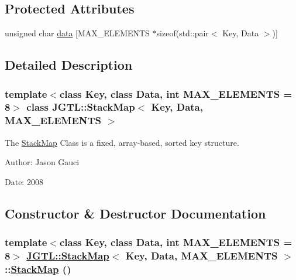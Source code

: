 \subsection*{Protected Attributes}
\begin{CompactItemize}
\item 
unsigned char \hyperlink{class_j_g_t_l_1_1_stack_map_9a3cc307f2892b669714253d75792e2e}{data} \mbox{[}MAX\_\-ELEMENTS $\ast$sizeof(std::pair$<$ Key, Data $>$)\mbox{]}
\end{CompactItemize}


\subsection{Detailed Description}
\subsubsection*{template$<$class Key, class Data, int MAX\_\-ELEMENTS = 8$>$ class JGTL::Stack\-Map$<$ Key, Data, MAX\_\-ELEMENTS $>$}

The \hyperlink{class_j_g_t_l_1_1_stack_map}{Stack\-Map} Class is a fixed, array-based, sorted key structure. 

\begin{Desc}
\item[Author:]Jason Gauci \end{Desc}
\begin{Desc}
\item[Date:]2008 \end{Desc}




\subsection{Constructor \& Destructor Documentation}
\hypertarget{class_j_g_t_l_1_1_stack_map_e6cb52e89d332a1438fa0b807081c46a}{
\subsubsection[StackMap]{\setlength{\rightskip}{0pt plus 5cm}template$<$class Key, class Data, int MAX\_\-ELEMENTS = 8$>$ \hyperlink{class_j_g_t_l_1_1_stack_map}{JGTL::Stack\-Map}$<$ Key, Data, MAX\_\-ELEMENTS $>$::\hyperlink{class_j_g_t_l_1_1_stack_map}{Stack\-Map} ()}}
\label{class_j_g_t_l_1_1_stack_map_e6cb52e89d332a1438fa0b807081c46a}


